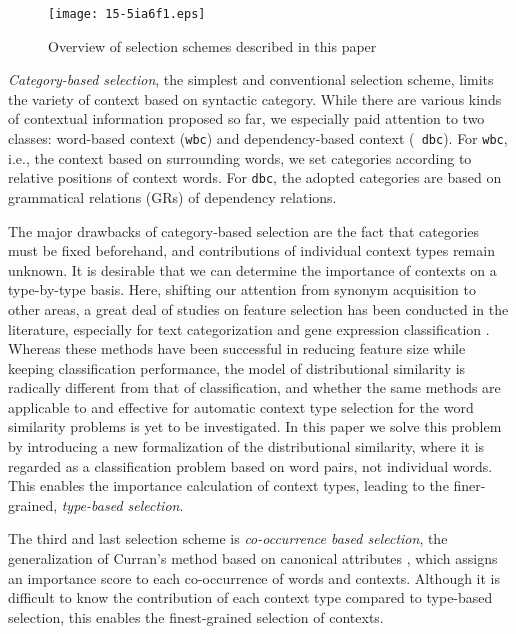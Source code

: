 \documentclass[english]{jnlp_1.4}
\begin{document}
\begin{figure}[t]
\begin{center}
\texttt{[image: 15-5ia6f1.eps]}
\end{center}
\caption{Overview of selection schemes described in this paper}
\label{fig_overview}
\end{figure}

{\em Category-based selection}, the simplest and conventional
selection scheme, limits the variety of context based on syntactic
category. While there are various kinds of contextual information
proposed so far, we especially paid attention to two classes:
word-based context ({\tt wbc}) and dependency-based context ({\tt
dbc}). For {\tt wbc}, i.e., the context based on surrounding words, we
set categories according to relative positions of context
words. For {\tt dbc}, the adopted categories are based on grammatical
relations (GRs) \cite{Briscoe:02:gr} of dependency relations.

The major drawbacks of category-based selection are the fact that
categories must be fixed beforehand, and contributions of individual
context types remain unknown. It is desirable that we can determine
the importance of contexts on a type-by-type basis. Here, shifting our
attention from synonym acquisition to other areas, a great deal of
studies on feature selection has been conducted in the literature,
especially for text categorization \cite{Yang:97} and gene expression
classification \cite{Ding:03}. Whereas these methods have been
successful in reducing feature size while keeping classification
performance, the model of distributional similarity is radically
different from that of classification, and whether the same methods
are applicable to and effective for automatic context type selection
for the word similarity problems is yet to be investigated. In this
paper we solve this problem by introducing a new formalization of the
distributional similarity, where it is regarded as a classification
problem based on word pairs, not individual words. This enables the
importance calculation of context types, leading to the finer-grained,
{\em type-based selection}.

The third and last selection scheme is {\em co-occurrence based
selection}, the generalization of Curran's method based on canonical
attributes \cite{Curran:02:improvements}, which assigns an importance
score to each co-occurrence of words and contexts. Although it is
difficult to know the contribution of each context type compared to
type-based selection, this enables the finest-grained selection of
contexts.
\end{document}
